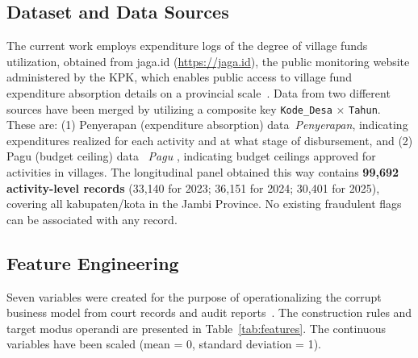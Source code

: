 \documentclass[3p,times,procedia]{elsarticle}
\begin{document}
\subsection{Dataset and Data Sources}

The current work employs expenditure logs of the degree of village funds utilization, obtained from jaga.id (\url{https://jaga.id}), the public monitoring website administered by the KPK, which enables public access to village fund expenditure absorption details on a provincial scale~\cite{ref9}. Data from two different sources have been merged by utilizing a composite key \texttt{Kode\_Desa} × \texttt{Tahun}. These are: (1) Penyerapan (expenditure absorption) data~\textit{Penyerapan}, indicating expenditures realized for each activity and at what stage of disbursement, and (2) Pagu (budget ceiling) data ~\textit{Pagu} , indicating budget ceilings approved for activities in villages. The longitudinal panel obtained this way contains \textbf{99,692 activity-level records} (33,140 for 2023; 36,151 for 2024; 30,401 for 2025), covering all kabupaten/kota in the Jambi Province. No existing fraudulent flags can be associated with any record.

\subsection{Feature Engineering}
\label{sec:features}

Seven variables were created for the purpose of operationalizing the corrupt business model from court records and audit reports~\cite{ref13, ref14}. The construction rules and target modus operandi are presented in Table~\ref{tab:features}. The continuous variables have been scaled (mean = 0, standard deviation = 1).
\end{document}
